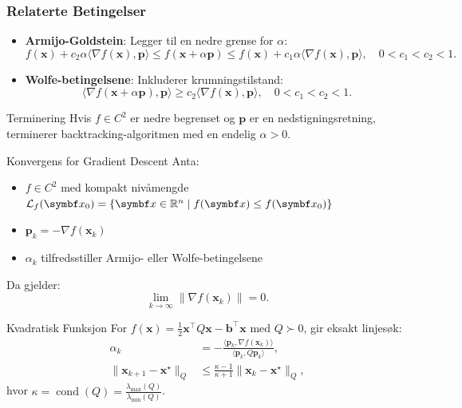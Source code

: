 \subsubsection*{Relaterte Betingelser}
\begin{itemize}
  \item \textbf{Armijo-Goldstein}: Legger til en nedre grense for \( \alpha \):
        \[
          f(\bm{x}) + c_2 \alpha \langle \nabla f(\bm{x}), \bm{p} \rangle \leq f(\bm{x} + \alpha \bm{p}) \leq f(\bm{x}) + c_1 \alpha \langle \nabla f(\bm{x}), \bm{p} \rangle, \quad 0 < c_1 < c_2 < 1.
        \]

  \item \textbf{Wolfe-betingelsene}: Inkluderer krumningstilstand:
        \[
          \langle \nabla f(\bm{x} + \alpha \bm{p}), \bm{p} \rangle \geq c_2 \langle \nabla f(\bm{x}), \bm{p} \rangle, \quad 0 < c_1 < c_2 < 1.
        \]
\end{itemize}

\begin{lemma}{Terminering}{}
  Hvis \( f \in C^2 \) er nedre begrenset og \( \bm{p} \) er en nedstigningsretning, terminerer backtracking-algoritmen med en endelig \( \alpha > 0 \).
\end{lemma}

\begin{theorem}{Konvergens for Gradient Descent}{}
  Anta:
  \begin{itemize}
    \item \( f \in C^2 \) med kompakt nivåmengde \( \mathcal{L}_f(\bm{x}_0) = \{\bm{x} \in \R^n \mid f(\bm{x}) \leq f(\bm{x}_0)\} \)
    \item \( \bm{p}_k = -\nabla f(\bm{x}_k) \)
    \item \( \alpha_k \) tilfredsstiller Armijo- eller Wolfe-betingelsene
  \end{itemize}
  Da gjelder:
  \[
    \lim_{k \to \infty} \|\nabla f(\bm{x}_k)\| = 0.
  \]
\end{theorem}

\begin{example}{Kvadratisk Funksjon}{}
  For \( f(\bm{x}) = \frac{1}{2} \bm{x}^\top Q \bm{x} - \bm{b}^\top \bm{x} \) med \( Q \succ 0 \), gir eksakt linjesøk:
  \begin{align*}
    \alpha_k                          & = -\frac{\langle \bm{p}_k, \nabla f(\bm{x}_k) \rangle}{\langle \bm{p}_k, Q \bm{p}_k \rangle}, \\
    \|\bm{x}_{k+1} - \bm{x}^\star\|_Q & \leq \frac{\kappa - 1}{\kappa + 1} \|\bm{x}_k - \bm{x}^\star\|_Q,
  \end{align*}
  hvor \( \kappa = \operatorname{cond}(Q) = \frac{\lambda_{\max}(Q)}{\lambda_{\min}(Q)} \).
\end{example}

